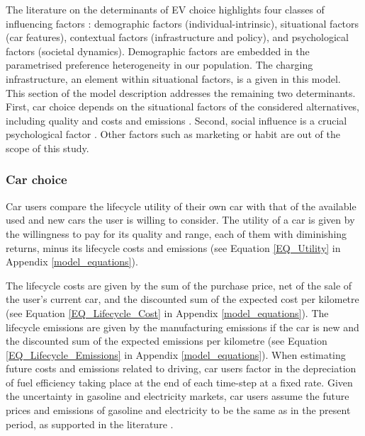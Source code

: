\documentclass[12pt]{article}
\begin{document}
    The literature on the determinants of EV choice highlights four classes of influencing factors \citep{singh_review_2020,pandita2024electrifying}: demographic factors (individual-intrinsic), situational factors (car features), contextual factors (infrastructure and policy), and psychological factors (societal dynamics). Demographic factors are embedded in the parametrised preference heterogeneity in our population. The charging infrastructure, an element within situational factors, is a given in this model. This section of the model description addresses the remaining two determinants. First, car choice depends on the situational factors of the considered alternatives, including quality and costs \citep{neves_technological_2019,hulshof2020willingness,pandita2024electrifying} and emissions \citep{hidrue2011willingness, biresselioglu_electric_2018,chen_assessing_2019}. Second, social influence is a crucial psychological factor \citep{sovacool2017experts,peng2024identifying}. Other factors such as marketing or habit \citep{singh_review_2020} are out of the scope of this study.

	\subsubsection{Car choice} \label{Users_Choice}

    Car users compare the lifecycle utility of their own car with that of the available used and new cars the user is willing to consider. The utility of a car is given by the willingness to pay for its quality and range, each of them with diminishing returns, minus its lifecycle costs and emissions \citep[p.4]{ipcc2022transport} (see Equation \ref{EQ_Utility} in Appendix \ref{model_equations}).

    The lifecycle costs are given by the sum of the purchase price, net of the sale of the user's current car, and the discounted sum of the expected cost per kilometre (see Equation \ref{EQ_Lifecycle_Cost} in Appendix \ref{model_equations}). The lifecycle emissions are given by the manufacturing emissions if the car is new and the discounted sum of the expected emissions per kilometre (see Equation \ref{EQ_Lifecycle_Emissions} in Appendix \ref{model_equations}). When estimating future costs and emissions related to driving, car users factor in the depreciation of fuel efficiency taking place at the end of each time-step at a fixed rate. Given the uncertainty in gasoline and electricity markets, car users assume the future prices and emissions of gasoline and electricity to be the same as in the present period, as supported in the literature \citep{Anderson2013}.
\end{document}
